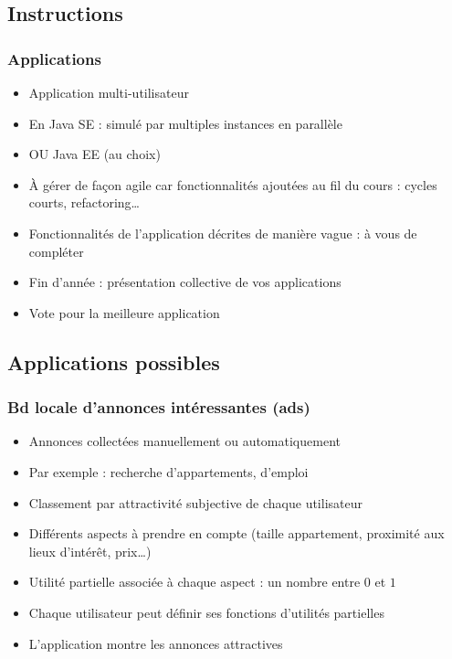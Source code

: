 \documentclass[english, french]{beamer}
\begin{document}
\subsection{Instructions}
\begin{frame}
	\frametitle{Applications}
	\begin{itemize}
		\item Application multi-utilisateur
		\item En Java SE : simulé par multiples instances en parallèle
		\item OU Java EE (au choix)
		\item À gérer de façon agile car fonctionnalités ajoutées au fil du cours : cycles courts, refactoring…
		\item Fonctionnalités de l’application décrites de manière vague : à vous de compléter
		\item Fin d’année : présentation collective de vos applications
		\item Vote pour la meilleure application
	\end{itemize}
\end{frame}

\subsection{Applications possibles}
\begin{frame}
	\frametitle{Bd locale d’annonces intéressantes (ads)}
	
	\begin{itemize}
		\item Annonces collectées manuellement {\tiny ou automatiquement}
		\item Par exemple : recherche d’appartements, d’emploi
		\item Classement par attractivité subjective de chaque utilisateur
		\item Différents aspects à prendre en compte (taille appartement, proximité aux lieux d’intérêt, prix…)
		\item Utilité partielle associée à chaque aspect : un nombre entre $0$ et $1$
		\item Chaque utilisateur peut définir ses fonctions d’utilités partielles
		\item L’application montre les annonces attractives
	\end{itemize}
\end{frame}
\end{document}
